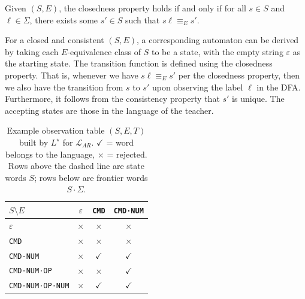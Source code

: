 \documentclass[journal]{IEEEtai}
\begin{document}
\begin{definition}[Closedness]
Given $(S, E)$, the closedness property holds if and only if for all $s \in S$ and $\ell \in \Sigma$, there exists some $s' \in S$ such that $s  \ell \equiv_E s'$.
\end{definition}

For a closed and consistent $(S, E)$, a corresponding automaton can be derived by taking each $E$-equivalence class of $S$ to be a state, with the empty string $\varepsilon$ as the starting state.
The transition function is defined using the closedness property. That is, whenever we have $s  \ell \equiv_E s'$ per the closedness property, then we also have the transition from $s$ to $s'$ upon observing the label $\ell$ in the DFA.
Furthermore, it follows from the consistency property that $s'$ is unique.
The accepting states are those in the language of the teacher.

\begin{table}[t]
\centering
\caption{Example observation table $(S, E, T)$ built by $L^\star$ for $\mathcal{L}_{AR}$. $\checkmark$ = word belongs to the language, $\times$ = rejected. Rows above the dashed line are state words $S$; rows below are frontier words $S \cdot \Sigma$.}
\label{tab:lstar_table}
\small
\begin{tabular}{l|ccc}
\hline
$S \setminus E$ & $\varepsilon$ & \texttt{CMD} & \texttt{CMD{\tiny·}NUM} \\
\hline
$\varepsilon$                    & $\times$ & $\times$ & $\times$ \\
\texttt{CMD}                     & $\times$ & $\times$ & $\times$ \\
\texttt{CMD{\tiny·}NUM}          & $\times$ & $\checkmark$ & $\checkmark$ \\
\hline
\texttt{CMD{\tiny·}NUM{\tiny·}OP}     & $\times$ & $\times$ & $\checkmark$ \\
\texttt{CMD{\tiny·}NUM{\tiny·}OP{\tiny·}NUM} & $\times$ & $\checkmark$ & $\checkmark$ \\
\hline
\end{tabular}
\end{table}
\end{document}
